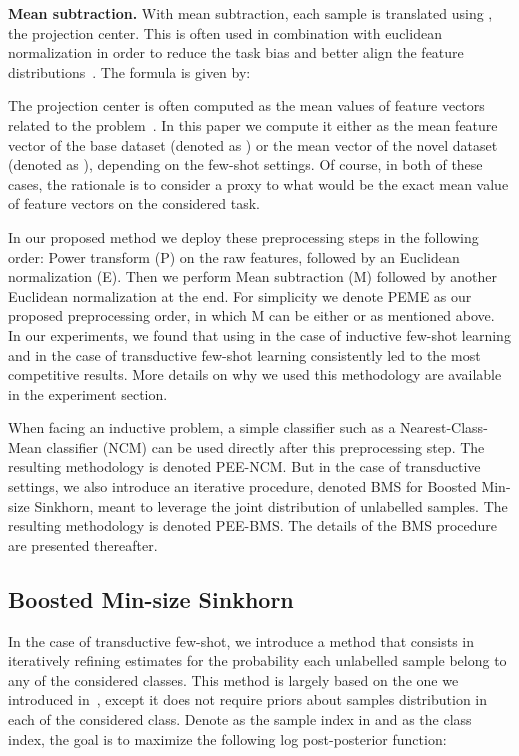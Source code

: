 \documentclass[review]{elsarticle}
\begin{document}
\textbf{Mean subtraction.} With mean subtraction, each sample is translated using , the projection center. This is often used in combination with euclidean normalization in order to reduce the task bias and better align the feature distributions~\cite{lichtenstein2020tafssl}. The formula is given by: 

The projection center is often computed as the mean values of feature vectors related to the problem~\cite{DBLP:journals/corr/abs-1911-04623, lichtenstein2020tafssl}. In this paper we compute it either as the mean feature vector of the base dataset (denoted as ) or the mean vector of the novel dataset (denoted as ), depending on the few-shot settings. Of course, in both of these cases, the rationale is to consider a proxy to what would be the exact mean value of feature vectors on the considered task.

In our proposed method we deploy these preprocessing steps in the following order: Power transform (P) on the raw features, followed by an Euclidean normalization (E). Then we perform Mean subtraction (M) followed by another Euclidean normalization at the end. For simplicity we denote PEME as our proposed preprocessing order, in which M can be either  or  as mentioned above. In our experiments, we found that using  in the case of inductive few-shot learning and  in the case of transductive few-shot learning consistently led to the most competitive results. More details on why we used this methodology are available in the experiment section.



When facing an inductive problem, a simple classifier such as a Nearest-Class-Mean classifier (NCM) can be used directly after this preprocessing step. The resulting methodology is denoted PEE-NCM. But in the case of transductive settings, we also introduce an iterative procedure, denoted BMS for Boosted Min-size Sinkhorn, meant to leverage the joint distribution of unlabelled samples. The resulting methodology is denoted PEE-BMS. The details of the BMS procedure are presented thereafter.



\subsection{Boosted Min-size Sinkhorn}

In the case of transductive few-shot, we introduce a method that consists in iteratively refining estimates for the probability each unlabelled sample belong to any of the considered classes. This method is largely based on the one we introduced in~\cite{hu2021leveraging}, except it does not require priors about samples distribution in each of the considered class. Denote  as the sample index in  and  as the class index, the goal is to maximize the following log post-posterior function: 
\end{document}
